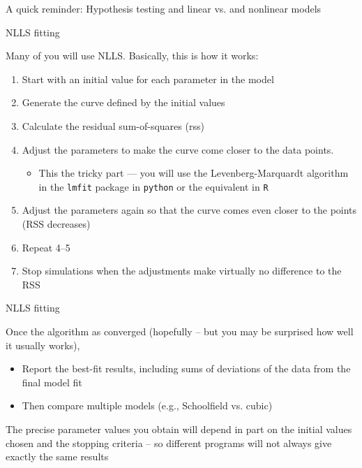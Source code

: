 \documentclass[xcolor=x11names,handout,compress]{beamer}
\renewcommand{\(}{\begin{columns}}
\renewcommand{\)}{\end{columns}}
\newcommand{\<}[1]{\begin{column}{#1}}
\renewcommand{\>}{\end{column}}
\begin{document}
\begin{frame}[plain]

 \begin{center}
	 \Large A quick reminder: Hypothesis testing and linear vs. and nonlinear models   
 \end{center} 

\end{frame}

\begin{frame}{NLLS fitting}

Many of you will use NLLS. Basically, this is how it works:

\begin{enumerate}[<+->] \itemsep4pt
	\item Start with an initial value for each parameter in the model
	\item Generate the curve defined by the initial values
	\item Calculate the residual sum-of-squares (rss)
	\item Adjust the parameters to make the curve come closer to the data 
	points. 
	\begin{itemize}
		
	\item This the tricky part --- you will use the Levenberg-Marquardt 
	algorithm in the {\tt lmfit} package in {\tt python} or the equivalent in {\tt R}
	\end{itemize}
		
		\item Adjust the parameters again so that the curve comes even closer 
	to the points (RSS decreases)
	\item Repeat 4--5
	\item Stop simulations when the adjustments make virtually no 
	difference to the RSS
\end{enumerate}
\end{frame}


\begin{frame}{NLLS fitting}

Once the algorithm as converged (hopefully -- but you may be surprised 
how well it usually works),
\begin{itemize}[<+->] \itemsep6pt
\item Report the best-fit results, including sums of deviations of the 
data from the final model fit
\item Then compare multiple models (e.g., Schoolfield vs. cubic) 
\end{itemize}

\pause The precise parameter values you obtain will depend in part on 
the initial values chosen and the stopping criteria -- \pause so different 
programs will not always give exactly the same results


\end{frame}
\end{document}
